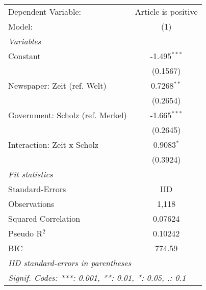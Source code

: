 
\begingroup
\centering
\begin{tabular}{lc}
   \tabularnewline \midrule \midrule
   Dependent Variable:              & Article is positive\\  
   Model:                           & (1)\\  
   \midrule
   \emph{Variables}\\
   Constant                         & -1.495$^{***}$\\   
                                    & (0.1567)\\   
   Newspaper: Zeit (ref. Welt)      & 0.7268$^{**}$\\   
                                    & (0.2654)\\   
   Government: Scholz (ref. Merkel) & -1.665$^{***}$\\   
                                    & (0.2645)\\   
   Interaction: Zeit x Scholz       & 0.9083$^{*}$\\   
                                    & (0.3924)\\   
   \midrule
   \emph{Fit statistics}\\
   Standard-Errors                  & IID \\   
   Observations                     & 1,118\\  
   Squared Correlation              & 0.07624\\  
   Pseudo R$^2$                     & 0.10242\\  
   BIC                              & 774.59\\  
   \midrule \midrule
   \multicolumn{2}{l}{\emph{IID standard-errors in parentheses}}\\
   \multicolumn{2}{l}{\emph{Signif. Codes: ***: 0.001, **: 0.01, *: 0.05, .: 0.1}}\\
\end{tabular}
\par\endgroup


